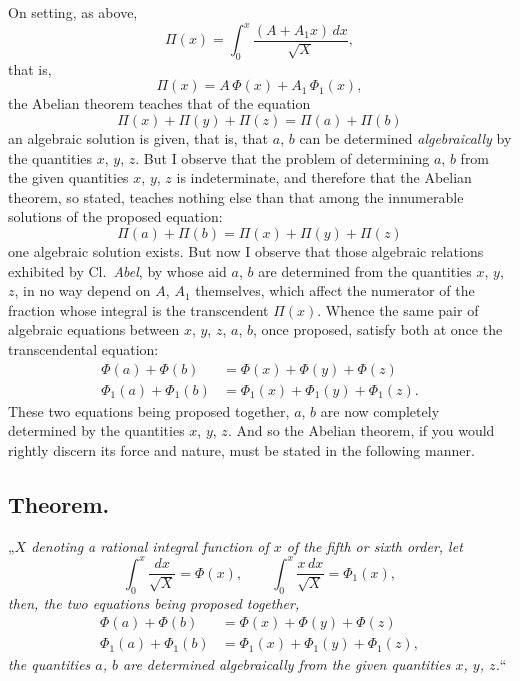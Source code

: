 \documentclass{article}
\begin{document}
On setting, as above,
\[ \Pi(x) = \int_0^{x} \frac{(A + A_1 x)\,dx}{\sqrt{X}}, \]
that is,
\[ \Pi(x) = A\,\Phi(x) + A_1\,\Phi_1(x), \]
the Abelian theorem teaches that of the equation
\[ \Pi(x) + \Pi(y) + \Pi(z) = \Pi(a) + \Pi(b) \]
an algebraic solution is given, that is, that $a$, $b$ can be determined \emph{algebraically} by the quantities $x$, $y$, $z$. But I observe that the problem of determining $a$, $b$ from the given quantities $x$, $y$, $z$ is indeterminate, and therefore that the Abelian theorem, so stated, teaches nothing else than that among the innumerable solutions of the proposed equation:
\[ \Pi(a) + \Pi(b) = \Pi(x) + \Pi(y) + \Pi(z) \]
one algebraic solution exists. But now I observe that those algebraic relations exhibited by Cl.\ \emph{Abel}, by whose aid $a$, $b$ are determined from the quantities $x$, $y$, $z$, in no way depend on $A$, $A_1$ themselves, which affect the numerator of the fraction whose integral is the transcendent $\Pi(x)$. Whence the same pair of algebraic equations between $x$, $y$, $z$, $a$, $b$, once proposed, satisfy both at once the transcendental equation:
\[ \begin{aligned} \Phi(a) + \Phi(b) &= \Phi(x) + \Phi(y) + \Phi(z) \\ \Phi_1(a) + \Phi_1(b) &= \Phi_1(x) + \Phi_1(y) + \Phi_1(z). \end{aligned} \]
These two equations being proposed together, $a$, $b$ are now completely determined by the quantities $x$, $y$, $z$. And so the Abelian theorem, if you would rightly discern its force and nature, must be stated in the following manner.

\subsection*{Theorem.}

„\emph{$X$ denoting a rational integral function of $x$ of the fifth or sixth order, let}
\[ \int_0^{x} \frac{dx}{\sqrt{X}} = \Phi(x), \qquad \int_0^{x} \frac{x\,dx}{\sqrt{X}} = \Phi_1(x), \]
\emph{then, the two equations being proposed together,}
\[ \begin{aligned} \Phi(a) + \Phi(b) &= \Phi(x) + \Phi(y) + \Phi(z) \\ \Phi_1(a) + \Phi_1(b) &= \Phi_1(x) + \Phi_1(y) + \Phi_1(z), \end{aligned} \]
\emph{the quantities $a$, $b$ are determined algebraically from the given quantities $x$, $y$, $z$.}“
\end{document}
